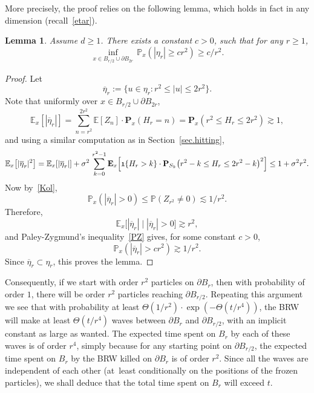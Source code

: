 \documentclass[11pt]{article}
\numberwithin{equation}{section}
\theoremstyle{plain}
\newtheorem{lemma}[theorem]{Lemma}
\theoremstyle{definition}
\newcommand{\1}{{\text{\Large $\mathfrak 1$}}}
\begin{document}
More precisely, the proof relies on the following lemma, which holds in fact in any dimension (recall~\eqref{etar}).
\begin{lemma}\label{lem.inf.etar} Assume $d\ge 1$.
There exists a constant $c>0$, such that for any $r\ge 1$,
\[
\inf_{x\in B_{r/2}\cup \partial B_{2r}} \, \mathbb P_x(|\eta_r|\ge cr^2) \geq c/r^2.
\]
\end{lemma}

\begin{proof} Let
\[
\overline{\eta}_r := \{u\in \eta_r : r^2\le |u|\le 2r^2\}.
\]
Note that uniformly over $x\in B_{r/2} \cup \partial B_{2r}$,
\[
\mathbb E_x[|\overline{\eta}_r|] = \sum_{n=r^2}^{2r^2} \mathbb E[Z_n]
\cdot \mathbf P_x(H_r = n ) = \mathbf P_x(r^2\le H_r\le 2r^2 ) \gtrsim 1,
\]
and using a similar computation as in Section~\ref{sec.hitting},
\begin{equation*}
\mathbb E_x\big[|\overline{\eta}_r|^2\big] =
\mathbb E_x[|\overline{\eta}_r|] + \sigma^2\, \sum_{k=0}^{r^2-1}
\mathbf E_x\Big[\1\{H_r>k\}\cdot
\mathbf P_{S_k}\big(r^2-k\le H_r\le 2r^2-k\big)^2\Big] \le 1+\sigma^2 r^2.
\end{equation*}
Now by~\eqref{Kol},
\[
\mathbb P_x(|\overline{\eta}_r|>0 ) \le \mathbb P(Z_{r^2}\neq 0) \lesssim 1/r^2.
\]
Therefore,
\[
\mathbb E_x\big[|\overline{\eta}_r| \mid |\overline{\eta}_r|>0\big] \gtrsim r^2,
\]
and Paley-Zygmund's inequality~\eqref{PZ} gives, for some constant $c>0$,
\[
\mathbb P_x\left(|\overline{\eta}_r| > cr^2\right) \gtrsim 1/r^2.
\]
Since $\overline{\eta}_r\subset \eta_r$, this proves the lemma.
\end{proof}

Consequently, if we start with order $r^2$ particles on $\partial B_r$, then with probability of order $1$, there will be order $r^2$ particles reaching
$\partial B_{r/2}$. Repeating this argument we see that with probability at least
$\Theta(1/r^2) \cdot \exp(-\Theta(t/r^4))$, the BRW will
make at least $\Theta(t/r^4)$ waves between $\partial B_r$ and $\partial B_{r/2}$, with an implicit constant as large as wanted.
The expected time spent on $B_r$ by each of these waves is of
order $r^4$, simply because for any starting point on $\partial B_{r/2}$, the expected time spent on $B_r$ by the BRW killed on $\partial B_r$ is
of order $r^2$.
Since all the waves are independent of each other (at~least conditionally on the positions of the frozen particles), we shall deduce
that the total time spent on $B_r$ will exceed $t$.
\end{document}
